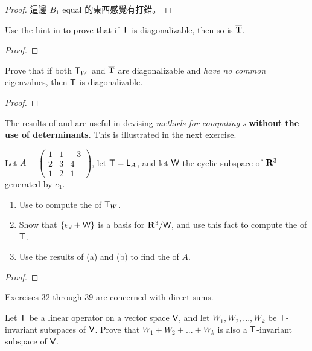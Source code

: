\begin{proof}
這邊 \(B_1\) equal 的東西感覺有打錯。
\end{proof}

\begin{exercise} \label{exercise 5.4.29}
Use the hint in  to prove that if \(\textsf{T}\) is diagonalizable, then so is \(\mathrm{\overline{T}}\).
\end{exercise}

\begin{proof}
\end{proof}

\begin{exercise} \label{exercise 5.4.30}
Prove that if both \(\textsf{T}_W\) and \(\mathrm{\overline{T}}\) are diagonalizable and \emph{have no common} eigenvalues, then \(\textsf{T}\) is diagonalizable.
\end{exercise}

\begin{proof}
\end{proof}

The results of  and  are useful in devising \emph{methods for computing \CPOLY{}s} \textbf{without the use of determinants}.
This is illustrated in the next exercise.

\begin{exercise} \label{exercise 5.4.31}
Let \(A = \begin{pmatrix} 1 & 1 & -3 \\ 2 & 3 & 4 \\ 1 & 2 & 1 \end{pmatrix}\), let \(\textsf{T} = \textsf{L}_A\), and let \(\textsf{W}\) the cyclic subspace of \(\mathbf{R}^3\) generated by \(e_1\).

\begin{enumerate}
\item Use  to compute the \CPOLY{} of \(\textsf{T}_W\).
\item Show that \(\{ e_2 + \textsf{W} \}\) is a basis for \(\mathbf{R}^3/\textsf{W}\), and use this fact to compute the \CPOLY{} of \(\textsf{T}\).
\item Use the results of (a) and (b) to find the \CPOLY{} of \(A\).
\end{enumerate}
\end{exercise}

\begin{proof}
\end{proof}

Exercises 32 through 39 are concerned with direct sums.

\begin{exercise} \label{exercise 5.4.32}
Let \(\textsf{T}\) be a linear operator on a vector space \(\textsf{V}\), and let \(W_1, W_2 , ..., W_k\) be \(\textsf{T}\)-invariant subspaces of \(\textsf{V}\).
Prove that \(W_1 + W_2 + ... + W_k\) is also a \(\textsf{T}\)-invariant subspace of \(\textsf{V}\).
\end{exercise}

